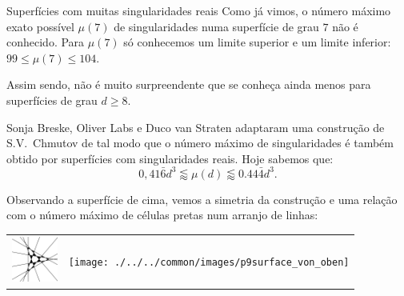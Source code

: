 \begin{surferPage}[216 Sing.]{Superf\'icies com muitas singularidades reais}
    Como j\'a vimos, o n\'umero m\'aximo  exato poss\'ivel   $\mu(7)$
de singularidades numa superf\'icie de grau $7$ 
 n\~ao \'e conhecido.
    Para  $\mu(7)$  s\'o conhecemos um limite superior e um limite  inferior: $99\le \mu(7) \le 104$. 


    Assim sendo, n\~ao \'e muito surpreendente que se conhe\c ca ainda menos para superf\'icies de grau $d \ge 8$. 

    Sonja Breske, Oliver Labs e Duco van Straten adaptaram uma constru\c c\~ao de S.V.\ Chmutov de tal modo que o n\'umero m\'aximo de singularidades \'e tamb\'em obtido por superf\'icies com singularidades reais. Hoje sabemos que:
    \[0,41\bar{6}d^3 \lessapprox \mu(d) \lessapprox 0.44\bar{4} d^3.\]

    Observando a superf\'icie de cima, vemos a simetria da constru\c c\~ao e uma rela\c c\~ao com o n\'umero m\'aximo de c\'elulas pretas num arranjo de linhas:
    \begin{center}
      \begin{tabular}{c@{\qquad}c}
        \includegraphics[height=1.5cm]{./../../common/images/vielesing.pdf}
        &
        \texttt{[image: ./../../common/images/p9surface\_von\_oben]}
      \end{tabular}
    \end{center}
\end{surferPage}

